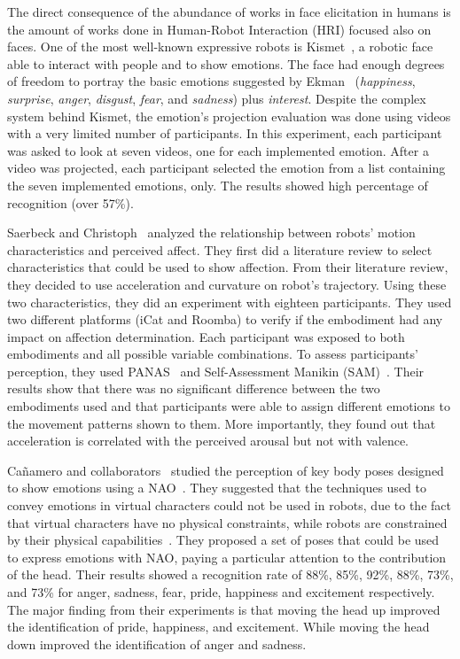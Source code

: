 The direct consequence of the abundance of works in face elicitation in humans is the amount of works done in Human-Robot Interaction (HRI) focused also on faces. One of the most well-known expressive robots is Kismet~\cite{Breazeal2002}, a robotic face able to interact with people and to show emotions. The face had enough degrees of freedom to portray the basic emotions suggested by Ekman~\cite{Ekman2004} (\textit{happiness}, \textit{surprise}, \textit{anger}, \textit{disgust}, \textit{fear}, and \textit{sadness}) plus \textit{interest}.  Despite the complex system behind Kismet, the emotion's projection evaluation was done using videos with a very limited number of participants. In this experiment, each participant was asked to look at seven videos, one for each implemented emotion. After a video was projected, each participant selected the emotion from a list containing  the seven implemented emotions, only. The results showed high percentage of recognition (over 57\%).

Saerbeck and Christoph~\cite{Saerbeck2010} analyzed the relationship between robots' motion characteristics and perceived affect. They first did a literature review to select characteristics that could be used to show affection. From their literature review, they decided to use acceleration and curvature on robot's trajectory. 
Using these two characteristics, they did an experiment with eighteen participants. They used two different platforms (iCat and Roomba) to verify if the embodiment had any impact on affection determination. Each participant was exposed to both embodiments and all possible variable combinations. To assess participants' perception, they used PANAS~\cite{WatsonClarkTellegen88} and Self-Assessment Manikin (SAM)~\cite{Lang2008}. Their results show that there was no significant difference between the two embodiments used and that participants were able to assign different emotions to the movement patterns shown to them. 
More importantly, they found out that acceleration is correlated with the perceived arousal but not with valence. 

Ca\~namero and collaborators~\cite{Canamero2010,Beck2010} studied the perception of key body poses designed to show emotions using a NAO~\cite{NAO2013}. They suggested that the techniques used to convey emotions in virtual characters could not be used in robots, due to the fact that virtual characters have no physical constraints, while robots are constrained by their physical capabilities~\cite{Saerbeck2007, Canamero2010}. They proposed a set of poses that could be used to express emotions with NAO, paying a particular attention to the contribution of the head. Their results showed a recognition rate of 88\%, 85\%, 92\%, 88\%, 73\%, and 73\% for anger, sadness, fear, pride, happiness and excitement respectively. The major finding from their experiments is that moving the head up improved the identification of pride, happiness, and excitement. While moving the head down improved the identification of anger and sadness. 

